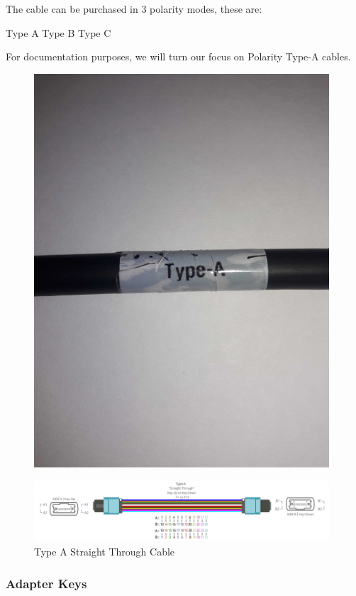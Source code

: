 The cable can be purchased in 3 polarity modes, these are:

    Type A
    Type B
    Type C

For documentation purposes, we will turn our focus on Polarity Type-A cables.

\begin{figure}
  \includegraphics[width=11cm]{images/66.jpg}
  \centering
  \label{fig:jlsimon}
\end{figure}

\begin{figure}
  \includegraphics[width=11cm]{images/7.png}
  \centering
  \caption{Type A Straight Through Cable}
  \label{fig:jlsimon}
\end{figure}

\subsubsection{Adapter Keys}

